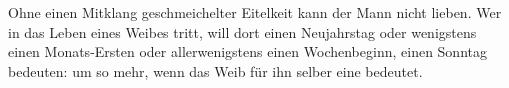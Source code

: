 Ohne einen Mitklang geschmeichelter Eitelkeit kann der Mann nicht lieben. Wer in das Leben eines Weibes tritt, will dort einen Neujahrstag oder wenigstens einen Monats-Ersten oder allerwenigstens einen Wochenbeginn, einen Sonntag bedeuten: um so mehr, wenn das Weib für ihn selber eine  bedeutet.
\par

